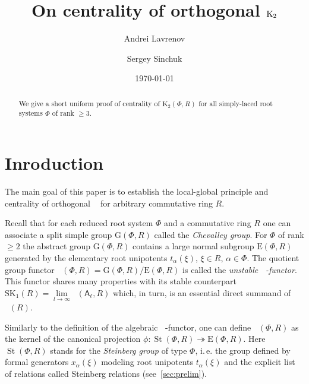 \documentclass[11pt]{amsart}
\title{On centrality of orthogonal $\Kt$}
\author {Andrei Lavrenov}
\author{Sergey Sinchuk}
\date {\today}
\theoremstyle{plain} \declaretheorem[name=Theorem, Refname={Theorem,Theorems}]{tm} \Crefname{tm}{Theorem}{Theorems}
\numberwithin{equation}{section}
\theoremstyle{definition} \newtheorem{df}[lm]{Definition} \Crefname{df}{Definition}{Definitions}
\theoremstyle{remark} \newtheorem{rk}[lm]{Remark} \Crefname{rk}{Remark}{Remarks}
\newcommand{\E}{{\mathrm{E}}}
\newcommand{\GG}{{\mathrm{G}}}
\newcommand{\St}{\mathop{\mathrm{St}}\nolimits}
\newcommand{\Kt}{\mathop{\mathrm{K_2}}\nolimits}
\newcommand{\Ko}{\mathop{\mathrm{K_1}}\nolimits}
\newcommand{\rA}{\mathsf{A}}
\begin{document}
\begin{abstract} We give a short uniform proof of centrality of $\mathrm K_2(\Phi, R)$ for all simply-laced root systems $\Phi$ of rank $\geq 3$.
\end{abstract}

\maketitle


\section*{Inroduction}
The main goal of this paper is to establish the local-global principle and centrality of orthogonal $\Kt$ for arbitrary commutative ring $R$.

Recall that for each reduced root system $\Phi$ and a commutative ring $R$ one can associate a split simple group $\GG(\Phi, R)$ called the \emph{Chevalley group}.
For $\Phi$ of rank $\geq 2$ the abstract group $\GG(\Phi, R)$ contains a large normal subgroup $\E(\Phi, R)$ generated by the elementary root unipotents $t_\alpha(\xi)$, $\xi\in R$, $\alpha\in \Phi$.
The quotient group functor $\Ko(\Phi, R)=\GG(\Phi, R)/\E(\Phi, R)$ is called the \emph{unstable $\Ko$-functor}.
This functor shares many properties with its stable counterpart $\mathrm{SK}_1(R) = \lim\limits_{l\to\infty}\Ko(\rA_\ell, R)$ which, in turn, is an essential direct summand of $\Ko(R)$.

Similarly to the definition of the algebraic $\Kt$-functor, one can define $\Kt(\Phi, R)$ as the kernel of the canonical projection $\phi\colon\St(\Phi, R)\twoheadrightarrow \E(\Phi, R)$.
Here $\St(\Phi, R)$ stands for the \emph{Steinberg group} of type $\Phi$, i.\,e. the group defined by formal generators $x_\alpha(\xi)$ modeling root unipotents $t_\alpha(\xi)$
and the explicit list of relations called Steinberg relations (see~\cref{sec:prelim}). 
\end{document}

